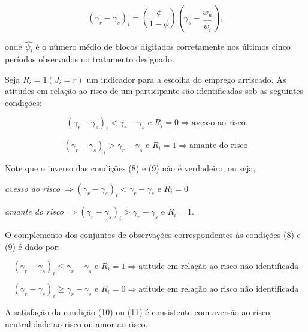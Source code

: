 \documentclass[a4paper,12pt]{article}[abntex2]
\begin{document}
\begin{equation}
(\gamma_r - \gamma_s)_i = \left( \frac{\phi}{1 - \phi} \right) \left( \gamma_s - \frac{w_u}{\hat{\psi_i}} \right),
\end{equation}

onde \( \hat{\psi_i} \) é o número médio de blocos digitados corretamente nos últimos cinco períodos observados no tratamento designado.

Seja \( R_i = 1(J_i = r) \) um indicador para a escolha do emprego arriscado. As atitudes em relação ao risco de um participante são identificadas sob as seguintes condições:

\begin{equation}
(\gamma_r - \gamma_s)_i < \gamma_r - \gamma_s \text{ e } R_i = 0 \Rightarrow \text{avesso ao risco} \tag{8}
\end{equation}

\begin{equation}
(\gamma_r - \gamma_s)_i > \gamma_r - \gamma_s \text{ e } R_i = 1 \Rightarrow \text{amante do risco} \tag{9}
\end{equation}

Note que o inverso das condições (8) e (9) não é verdadeiro, ou seja,

\textit{avesso ao risco} \( \Rightarrow (\gamma_r - \gamma_s)_i < \gamma_r - \gamma_s \text{ e } R_i = 0 \)

\textit{amante do risco} \( \Rightarrow (\gamma_r - \gamma_s)_i > \gamma_r - \gamma_s \text{ e } R_i = 1 \).

O complemento dos conjuntos de observações correspondentes às condições (8) e (9) é dado por:

\begin{equation}
(\gamma_r - \gamma_s)_i \leq \gamma_r - \gamma_s \text{ e } R_i = 1 \Rightarrow \text{atitude em relação ao risco não identificada} \tag{10}
\end{equation}

\begin{equation}
(\gamma_r - \gamma_s)_i \geq \gamma_r - \gamma_s \text{ e } R_i = 0 \Rightarrow \text{atitude em relação ao risco não identificada} \tag{11}
\end{equation}

A satisfação da condição (10) ou (11) é consistente com aversão ao risco, neutralidade ao risco ou amor ao risco.
\end{document}
